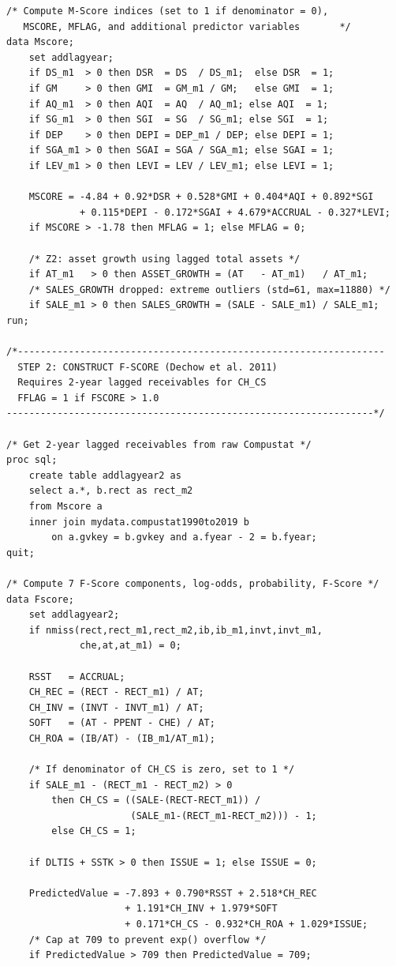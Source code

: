 \documentclass[12pt]{article}
\begin{document}
\begin{lstlisting}
/* Compute M-Score indices (set to 1 if denominator = 0),
   MSCORE, MFLAG, and additional predictor variables       */
data Mscore;
    set addlagyear;
    if DS_m1  > 0 then DSR  = DS  / DS_m1;  else DSR  = 1;
    if GM     > 0 then GMI  = GM_m1 / GM;   else GMI  = 1;
    if AQ_m1  > 0 then AQI  = AQ  / AQ_m1; else AQI  = 1;
    if SG_m1  > 0 then SGI  = SG  / SG_m1; else SGI  = 1;
    if DEP    > 0 then DEPI = DEP_m1 / DEP; else DEPI = 1;
    if SGA_m1 > 0 then SGAI = SGA / SGA_m1; else SGAI = 1;
    if LEV_m1 > 0 then LEVI = LEV / LEV_m1; else LEVI = 1;

    MSCORE = -4.84 + 0.92*DSR + 0.528*GMI + 0.404*AQI + 0.892*SGI
             + 0.115*DEPI - 0.172*SGAI + 4.679*ACCRUAL - 0.327*LEVI;
    if MSCORE > -1.78 then MFLAG = 1; else MFLAG = 0;

    /* Z2: asset growth using lagged total assets */
    if AT_m1   > 0 then ASSET_GROWTH = (AT   - AT_m1)   / AT_m1;
    /* SALES_GROWTH dropped: extreme outliers (std=61, max=11880) */
    if SALE_m1 > 0 then SALES_GROWTH = (SALE - SALE_m1) / SALE_m1;
run;

/*-----------------------------------------------------------------
  STEP 2: CONSTRUCT F-SCORE (Dechow et al. 2011)
  Requires 2-year lagged receivables for CH_CS
  FFLAG = 1 if FSCORE > 1.0
-----------------------------------------------------------------*/

/* Get 2-year lagged receivables from raw Compustat */
proc sql;
    create table addlagyear2 as
    select a.*, b.rect as rect_m2
    from Mscore a
    inner join mydata.compustat1990to2019 b
        on a.gvkey = b.gvkey and a.fyear - 2 = b.fyear;
quit;

/* Compute 7 F-Score components, log-odds, probability, F-Score */
data Fscore;
    set addlagyear2;
    if nmiss(rect,rect_m1,rect_m2,ib,ib_m1,invt,invt_m1,
             che,at,at_m1) = 0;

    RSST   = ACCRUAL;
    CH_REC = (RECT - RECT_m1) / AT;
    CH_INV = (INVT - INVT_m1) / AT;
    SOFT   = (AT - PPENT - CHE) / AT;
    CH_ROA = (IB/AT) - (IB_m1/AT_m1);

    /* If denominator of CH_CS is zero, set to 1 */
    if SALE_m1 - (RECT_m1 - RECT_m2) > 0
        then CH_CS = ((SALE-(RECT-RECT_m1)) /
                      (SALE_m1-(RECT_m1-RECT_m2))) - 1;
        else CH_CS = 1;

    if DLTIS + SSTK > 0 then ISSUE = 1; else ISSUE = 0;

    PredictedValue = -7.893 + 0.790*RSST + 2.518*CH_REC
                     + 1.191*CH_INV + 1.979*SOFT
                     + 0.171*CH_CS - 0.932*CH_ROA + 1.029*ISSUE;
    /* Cap at 709 to prevent exp() overflow */
    if PredictedValue > 709 then PredictedValue = 709;


\end{lstlisting}
\end{document}
